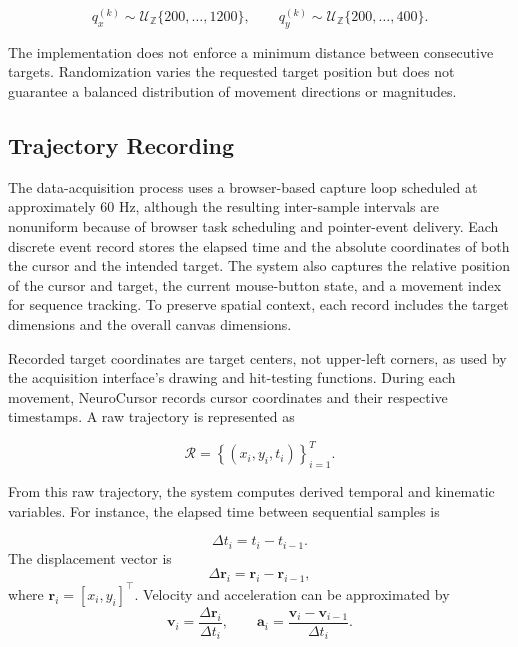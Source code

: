 \documentclass[conference]{IEEEtran}
\begin{document}
\begin{equation}
q_x^{(k)}\sim\mathcal{U}_{\mathbb{Z}}\{200,\ldots,1200\},
\qquad
q_y^{(k)}\sim\mathcal{U}_{\mathbb{Z}}\{200,\ldots,400\}.
\label{eq:target_sampling_bounds}
\end{equation}

The implementation does not enforce a minimum distance between consecutive
targets. Randomization varies the requested target position but does not
guarantee a balanced distribution of movement directions or magnitudes.

\subsection{Trajectory Recording}

The data-acquisition process uses a browser-based capture loop scheduled at approximately 60 Hz, although the resulting inter-sample intervals are nonuniform because of browser task scheduling and pointer-event delivery. Each discrete event record stores the elapsed time and the absolute coordinates of both the cursor and the intended target. The system also captures the relative position of the cursor and target, the current mouse-button state, and a movement index for sequence tracking. To preserve spatial context, each record includes the target dimensions and the overall canvas dimensions.

Recorded target coordinates are target centers, not upper-left corners, as
used by the acquisition interface's drawing and hit-testing functions.
During each movement, NeuroCursor records cursor coordinates and their respective timestamps. A raw trajectory is represented as

\begin{equation}
\mathcal{R}
=
\left\{
(x_i,y_i,t_i)
\right\}_{i=1}^{T}.
\label{eq:raw_trajectory}
\end{equation}

From this raw trajectory, the system computes derived temporal and kinematic variables. For instance, the elapsed time between sequential samples is

\begin{equation}
\Delta t_i = t_i - t_{i-1}.
\label{eq:delta_t}
\end{equation}
The displacement vector is
\begin{equation}
\Delta \mathbf{r}_i
=
\mathbf{r}_i-\mathbf{r}_{i-1},
\label{eq:displacement}
\end{equation}
where $\mathbf{r}_i=[x_i,y_i]^{\top}$. Velocity and acceleration can be
approximated by
\begin{equation}
\mathbf{v}_i
=
\frac{\Delta \mathbf{r}_i}{\Delta t_i},
\qquad
\mathbf{a}_i
=
\frac{\mathbf{v}_i-\mathbf{v}_{i-1}}{\Delta t_i}.
\label{eq:discrete_velocity_acceleration}
\end{equation}
\end{document}
